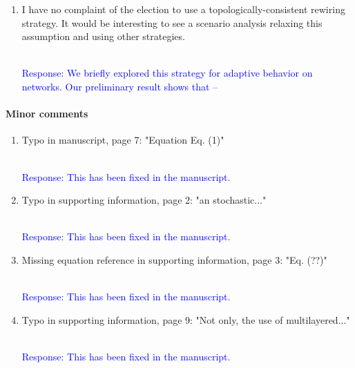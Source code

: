 \documentclass{article}
\newcommand{\blue}[1]{{\textcolor{blue}{#1}}}
\newcommand{\red}[1]{{\textcolor{red}{#1}}}
\begin{document}
\begin{enumerate}
    
    \item I have no complaint of the election to use a topologically-consistent rewiring strategy. It would be interesting to see a scenario analysis relaxing this assumption and using other strategies.
    
    \blue{\\Response:
    We briefly explored this strategy for adaptive behavior on networks. Our preliminary result shows that --
    }
\end{enumerate}

\paragraph{Minor comments}
\begin{enumerate}
    \item Typo in manuscript, page 7: "Equation Eq. (1)"  

    \blue{\\Response:
    This has been fixed in the manuscript.
    }
        
    \item Typo in supporting information, page 2: "an stochastic..." 

    \blue{\\Response:
    This has been fixed in the manuscript.
    }
    
    \item Missing equation reference in supporting information, page 3: "Eq. (??)" 

    \blue{\\Response:
    This has been fixed in the manuscript.
    }
    
    \item Typo in supporting information, page 9: "Not only, the use of multilayered..." 

     \blue{\\Response:
    This has been fixed in the manuscript.
    }
    
\end{enumerate}
\end{document}
